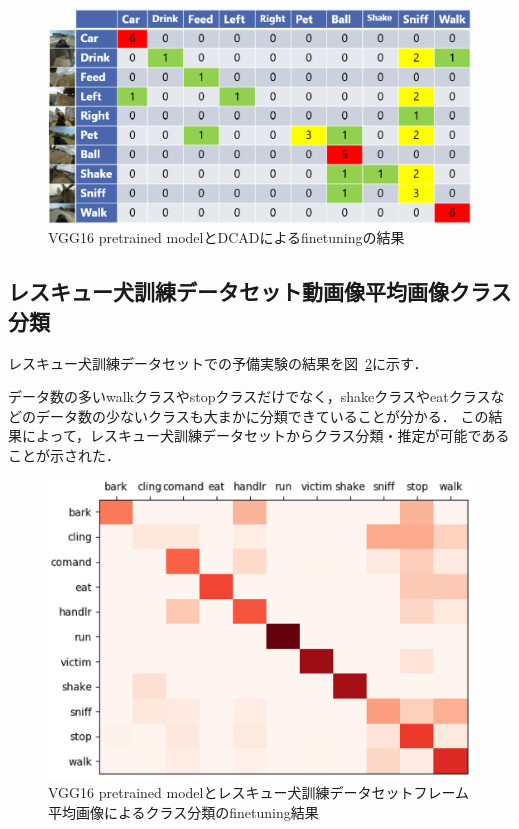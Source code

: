 \begin{figure}[htbp]
   \begin{center}

    \includegraphics[scale=0.5]{./Figures/vgg16_res.eps}
    \caption{VGG16 pretrained modelとDCADによるfinetuningの結果}
    \label{vgg16_res}
   \end{center}
\end{figure}

\subsection{レスキュー犬訓練データセット動画像平均画像クラス分類}
レスキュー犬訓練データセットでの予備実験の結果を図~\ref{sub_resque_res}に示す．

データ数の多いwalkクラスやstopクラスだけでなく，shakeクラスやeatクラスなどのデータ数の少ないクラスも大まかに分類できていることが分かる．
この結果によって，レスキュー犬訓練データセットからクラス分類・推定が可能であることが示された．
\begin{figure}[htbp]
  \begin{center}
    \includegraphics[scale=0.5]{./Figures/resque_mean_result.eps}
    \caption{VGG16 pretrained modelとレスキュー犬訓練データセットフレーム平均画像によるクラス分類のfinetuning結果}
    \label{sub_resque_res}
  \end{center}
\end{figure}

